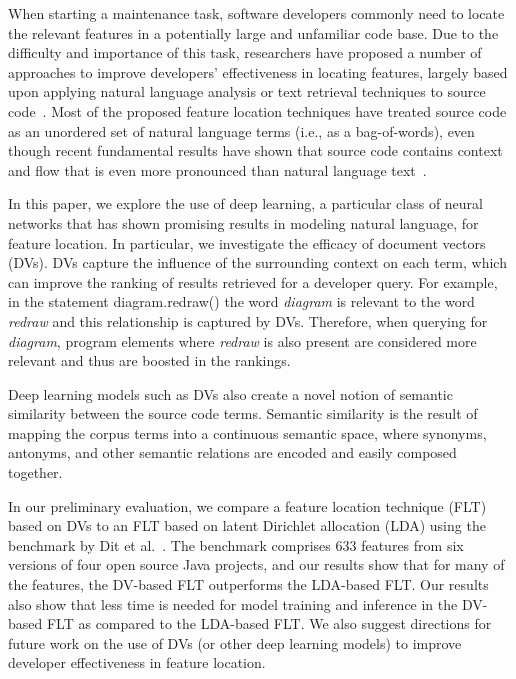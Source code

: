 
% 
%
When starting a maintenance task, software developers commonly need to
locate the relevant features in a potentially large and unfamiliar
code base. Due to the difficulty and importance of this task,
researchers have proposed a number of approaches to improve
developers' effectiveness in locating features, largely based upon
applying natural language analysis or text retrieval techniques to source
code~\cite{dit_feature_2013}. Most of the proposed feature location
techniques have treated source code as an unordered set of natural
language terms (i.e., as a bag-of-words), even though recent fundamental
results have shown that source code contains context and flow that is
even more pronounced than natural language
text~\cite{hindle_naturalness_2012}.


%
%
In this paper, we explore the use of deep learning, a particular class of neural networks that has shown promising
results in modeling natural language, for feature location. In
particular, we investigate the efficacy of document
vectors~\cite{le_distributed_2014} (DVs). DVs capture the
influence of the surrounding context on each term, which can improve the ranking
of results retrieved for a developer query. For example, in the
statement {\sf diagram.redraw()} the word {\em diagram} is relevant to the word
{\em redraw} and this relationship is captured by DVs. Therefore, when querying for {\em diagram}, program elements
where {\em redraw} is also present are considered more relevant and thus are boosted in the rankings.

Deep learning models such as DVs also create a novel notion
of semantic similarity between the source code terms. Semantic
similarity is the result of mapping the corpus terms into a continuous
semantic space, where synonyms, antonyms, and other semantic relations
are encoded and easily composed together.


%
%

In our preliminary evaluation, we compare a feature location technique (FLT) based on DVs to an FLT based on latent Dirichlet allocation (LDA) using the benchmark by Dit et al.~\cite{Dit-etal_2013}.
The benchmark comprises 633 features from six versions of four open source Java projects, and our results show that for many of the features, the DV-based FLT outperforms the LDA-based FLT.
Our results also show that less time is needed for model training and inference in the DV-based FLT as compared to the LDA-based FLT.
We also suggest directions for future work on the use
of DVs (or other deep learning models) to improve developer effectiveness in feature location.



